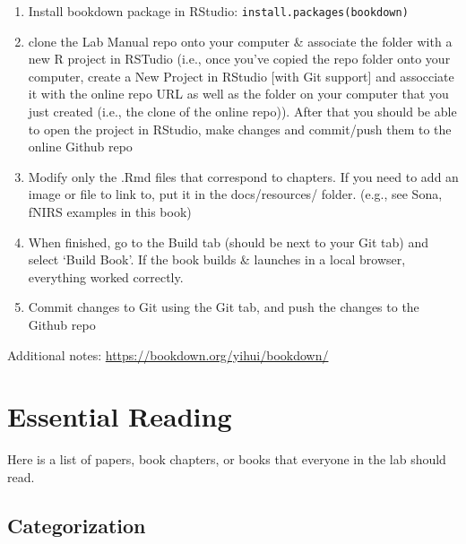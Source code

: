 \documentclass[
]{book}
\begin{document}
\begin{enumerate}
\def\labelenumi{\arabic{enumi}.}
\item
  Install bookdown package in RStudio: \texttt{install.packages(\textquotesingle{}bookdown\textquotesingle{})}
\item
  clone the Lab Manual repo onto your computer \& associate the folder with a new R project in RSTudio (i.e., once you've copied the repo folder onto your computer, create a New Project in RStudio {[}with Git support{]} and assocciate it with the online repo URL as well as the folder on your computer that you just created (i.e., the clone of the online repo)). After that you should be able to open the project in RStudio, make changes and commit/push them to the online Github repo
\item
  Modify only the .Rmd files that correspond to chapters. If you need to add an image or file to link to, put it in the docs/resources/ folder. (e.g., see Sona, fNIRS examples in this book)
\item
  When finished, go to the Build tab (should be next to your Git tab) and select `Build Book'. If the book builds \& launches in a local browser, everything worked correctly.
\item
  Commit changes to Git using the Git tab, and push the changes to the Github repo
\end{enumerate}

Additional notes: \url{https://bookdown.org/yihui/bookdown/}

\hypertarget{essential-reading}{%
\chapter{Essential Reading}\label{essential-reading}}

Here is a list of papers, book chapters, or books that everyone in the lab should read.

\hypertarget{categorization}{%
\section{Categorization}\label{categorization}}
\end{document}
